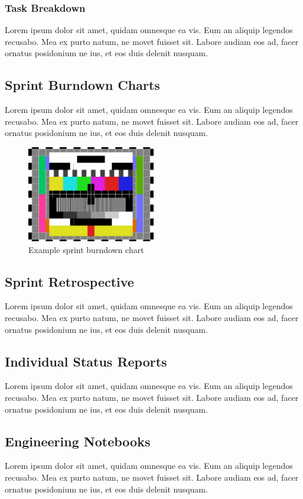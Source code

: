 \subsubsection{Task Breakdown}
Lorem ipsum dolor sit amet, quidam omnesque ea vis. Eum an aliquip legendos recusabo. Mea ex purto natum, ne movet fuisset sit. Labore audiam eos ad, facer ornatus posidonium ne ius, et eos duis delenit nusquam.

\subsection{Sprint Burndown Charts}
Lorem ipsum dolor sit amet, quidam omnesque ea vis. Eum an aliquip legendos recusabo. Mea ex purto natum, ne movet fuisset sit. Labore audiam eos ad, facer ornatus posidonium ne ius, et eos duis delenit nusquam.

\begin{figure}[h!]
    \centering
    \includegraphics[width=0.5\textwidth]{figures/test_image}
    \caption{Example sprint burndown chart}
\end{figure}

\subsection{Sprint Retrospective}
Lorem ipsum dolor sit amet, quidam omnesque ea vis. Eum an aliquip legendos recusabo. Mea ex purto natum, ne movet fuisset sit. Labore audiam eos ad, facer ornatus posidonium ne ius, et eos duis delenit nusquam.

\subsection{Individual Status Reports}
Lorem ipsum dolor sit amet, quidam omnesque ea vis. Eum an aliquip legendos recusabo. Mea ex purto natum, ne movet fuisset sit. Labore audiam eos ad, facer ornatus posidonium ne ius, et eos duis delenit nusquam.

\subsection{Engineering Notebooks}
Lorem ipsum dolor sit amet, quidam omnesque ea vis. Eum an aliquip legendos recusabo. Mea ex purto natum, ne movet fuisset sit. Labore audiam eos ad, facer ornatus posidonium ne ius, et eos duis delenit nusquam.

